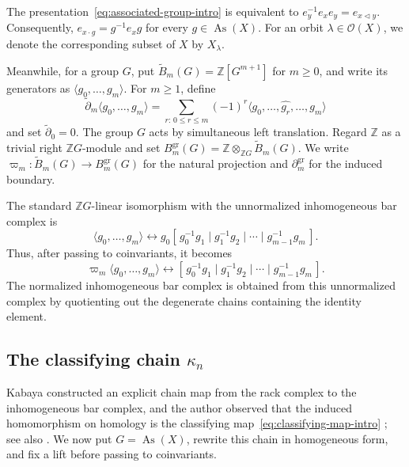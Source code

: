\documentclass[10pt,a4paper]{amsart}
\DeclareMathOperator{\As}{As}
\newcommand{\ZZ}{\mathbb Z}
\newcommand{\OO}{\mathcal O}
\newcommand{\tB}{\widetilde B}
\newcommand{\td}{\widetilde\partial}
\newcommand{\gr}{\mathrm{gr}}
\begin{document}
The presentation~\eqref{eq:associated-group-intro} is equivalent to $e_y^{-1}e_xe_y=e_{x\lhd y}$. Consequently, $e_{x\cdot g}=g^{-1}e_xg$ for every $g\in\As(X)$. For an orbit $\lambda\in\OO(X)$, we denote the corresponding subset of $X$ by $X_\lambda$.

Meanwhile, for a group $G$, put $\tB_m(G)=\ZZ[G^{m+1}]$ for $m\ge0$, and write its generators as $\langle g_0,\ldots,g_m\rangle$. For $m\ge1$, define
\[
\td_m\langle g_0,\ldots,g_m\rangle
        =
        \sum_{r:\,0\le r\le m}(-1)^r
        \langle g_0,\ldots,\widehat{g_r},\ldots,g_m\rangle
\]
and set $\td_0=0$. The group $G$ acts by simultaneous left translation. Regard $\ZZ$ as a trivial right $\ZZ G$-module and set $B_m^{\gr}(G)=\ZZ\otimes_{\ZZ G}\tB_m(G)$. We write $\varpi_m\colon\tB_m(G)\to B_m^{\gr}(G)$ for the natural projection and $\partial_m^{\gr}$ for the induced boundary.

The standard $\ZZ G$-linear isomorphism with the unnormalized inhomogeneous bar complex is
\[
\langle g_0,\ldots,g_m\rangle
 \longleftrightarrow
 g_0[\,g_0^{-1}g_1\mid g_1^{-1}g_2\mid\cdots\mid g_{m-1}^{-1}g_m\,].
\]
Thus, after passing to coinvariants, it becomes
\[
\varpi_m\langle g_0,\ldots,g_m\rangle
 \longleftrightarrow
 [\,g_0^{-1}g_1\mid g_1^{-1}g_2\mid\cdots\mid g_{m-1}^{-1}g_m\,].
\]
The normalized inhomogeneous bar complex is obtained from this unnormalized complex by quotienting out the degenerate chains containing the identity element.

\subsection{The classifying chain \texorpdfstring{$\kappa_n$}{kappa-n}}
\label{subsec:kappa-chain}

Kabaya constructed an explicit chain map from the rack complex to the inhomogeneous bar complex, and the author  observed that the induced homomorphism on homology is the classifying map~\eqref{eq:classifying-map-intro} \cite[\S8.4]{Kabaya}; see also \cite[\S6]{NosakaAdjoint}. We now put $G=\As(X)$, rewrite this chain in homogeneous form, and fix a lift before passing to coinvariants.
\end{document}
